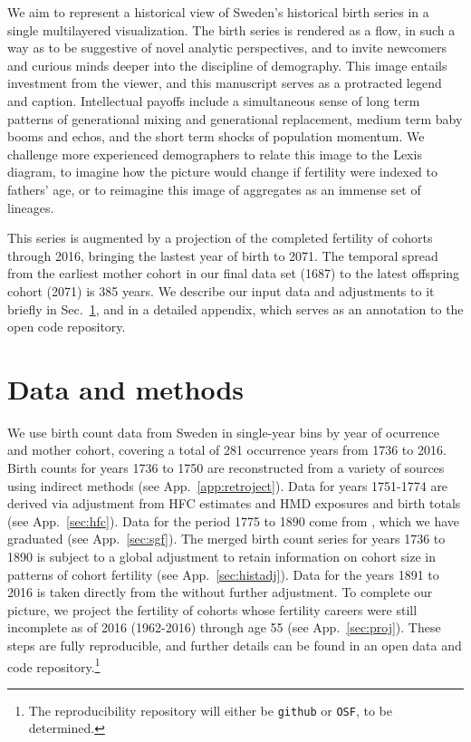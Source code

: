 \documentclass{article}
\begin{document}
We aim to represent a historical view of Sweden's historical birth series in a single multilayered visualization. The birth series is rendered as a flow, in such a way as to be suggestive of novel analytic perspectives, and to invite newcomers and curious minds deeper into the discipline of demography. This image entails investment from the viewer, and this manuscript serves as a protracted legend and caption. Intellectual payoffs include a simultaneous sense of long term patterns of generational mixing and generational replacement, medium term baby booms and echos, and the short term shocks of population momentum. We challenge more experienced demographers to relate this image to the Lexis diagram, to imagine how the picture would change if fertility were indexed to fathers' age, or to reimagine this image of aggregates as an immense set of lineages.

 This series is augmented by a projection of the completed fertility of cohorts through 2016, bringing the lastest year of birth to 2071. The temporal spread from the earliest mother cohort in our final data set (1687) to the latest offspring cohort (2071) is 385 years. We describe our input data and adjustments to it briefly in Sec.~\ref{sec:data}, and in a detailed appendix, which serves as an annotation to the open code repository.

\section{Data and methods}
\label{sec:data}
We use birth count data from Sweden in single-year bins by year of ocurrence and mother cohort, covering a total of 281 occurrence years from 1736 to 2016. Birth counts for years 1736 to 1750 are reconstructed from a variety of sources \citep{HFC, HMD, sweden1969historisk} using indirect methods (see App.~\ref{app:retroject}). Data for years 1751-1774 are derived via adjustment from HFC estimates and HMD exposures and birth totals (see App.~\ref{sec:hfc}). Data for the period 1775 to 1890 come from \citet{sgf1907}, which we have graduated (see App.~\ref{sec:sgf}). The merged birth count series for years 1736 to 1890 is subject to a global adjustment to retain information on cohort size in patterns of cohort fertility (see App.~\ref{sec:histadj}). Data for the years 1891 to 2016 is taken directly from the \citet{HFD} without further adjustment. To complete our picture, we project the fertility of cohorts whose fertility careers were still incomplete as of 2016 (1962-2016) through age 55 (see App.~\ref{sec:proj}). These steps are fully reproducible, and further details can be found in an open data and code repository.\footnote{The reproducibility repository will either be \texttt{github} or \texttt{OSF}, to be determined.}
\end{document}
